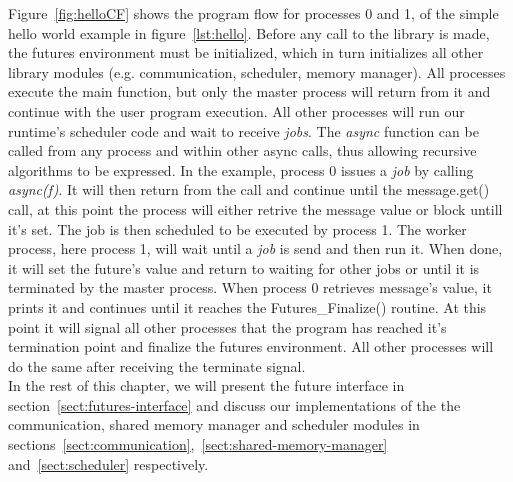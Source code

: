 Figure~\ref{fig:helloCF} shows the program flow for processes 0 and 1, of the simple
hello world example in figure~\ref{lst:hello}.  Before any call to the library is made, the futures
environment must be initialized, which in turn initializes all other library modules 
(e.g. communication, scheduler, memory manager).
All processes execute the main function, but only
the master process will return from it and continue with the user program execution.
All other processes will run our runtime's scheduler code and wait to receive \emph{jobs}.
The \emph{async} function can be called from any process 
and within other async calls, thus allowing recursive algorithms to be expressed. 
In the example, process 0 issues a \emph{job} by
calling \emph{async(f)}.  It will then return from the call and continue until
the message.get() call, at this point the process will either retrive the message value or block untill
it's set.
The job is then scheduled to be executed by process 1.  The worker process,
here process 1, will wait until a \emph{job} is send and then run it.  When done, it will set 
the future's value and return to waiting for other jobs or until it is terminated by the master
process.  When process 0 retrieves message's value, it prints it and continues until it reaches
the Futures\_Finalize() routine.  At this point it will signal all other processes that the program
has reached it's termination point and finalize the futures environment.  All other processes will
do the same after receiving the terminate signal.
\\

In the rest of this chapter, we will present the future interface in section~\ref{sect:futures-interface}
and discuss our implementations of the the communication, shared memory manager and scheduler modules in
sections~\ref{sect:communication},~\ref{sect:shared-memory-manager} and~\ref{sect:scheduler}
respectively.

